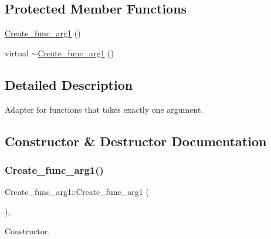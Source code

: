 \subsection*{Protected Member Functions}
\begin{DoxyCompactItemize}
\item 
\mbox{\hyperlink{classCreate__func__arg1_a0bf0a6607f16e428d9da4906138b8e6c}{Create\+\_\+func\+\_\+arg1}} ()
\item 
virtual \mbox{\hyperlink{classCreate__func__arg1_a84faa37c94225aae9f32118d6bf23de9}{$\sim$\+Create\+\_\+func\+\_\+arg1}} ()
\end{DoxyCompactItemize}


\subsection{Detailed Description}
Adapter for functions that takes exactly one argument. 

\subsection{Constructor \& Destructor Documentation}
\mbox{\label{classCreate__func__arg1_a0bf0a6607f16e428d9da4906138b8e6c}} 
\subsubsection{\texorpdfstring{Create\+\_\+func\+\_\+arg1()}{Create\_func\_arg1()}}
{\footnotesize\ttfamily Create\+\_\+func\+\_\+arg1\+::\+Create\+\_\+func\+\_\+arg1 (\begin{DoxyParamCaption}{ }\end{DoxyParamCaption})\hspace{0.3cm}{\ttfamily [inline]}, {\ttfamily [protected]}}

Constructor. \mbox{\label{classCreate__func__arg1_a84faa37c94225aae9f32118d6bf23de9}} 
